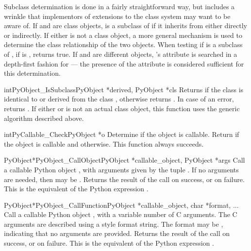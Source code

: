 \documentclass{manual}
\begin{document}
Subclass determination is done in a fairly straightforward way, but
includes a wrinkle that implementors of extensions to the class system
may want to be aware of.  If  and  are class
objects,  is a subclass of  if it inherits from
 either directly or indirectly.  If either is not a class
object, a more general mechanism is used to determine the class
relationship of the two objects.  When testing if  is a
subclass of , if  is ,
 returns true.  If  and
 are different objects, 's  attribute
is searched in a depth-first fashion for  --- the presence of
the  attribute is considered sufficient for this
determination.

\begin{cfuncdesc}{int}{PyObject_IsSubclass}{PyObject *derived,
                                            PyObject *cls}
Returns  if the class  is identical to or derived
from the class , otherwise returns .  In case of an
error, returns .  If either  or  is not
an actual class object, this function uses the generic algorithm
described above.
\end{cfuncdesc}


\begin{cfuncdesc}{int}{PyCallable_Check}{PyObject *o}
Determine if the object  is callable.  Return  if the
object is callable and  otherwise.
This function always succeeds.
\end{cfuncdesc}


\begin{cfuncdesc}{PyObject*}{PyObject_CallObject}{PyObject *callable_object,
                                                  PyObject *args}
Call a callable Python object , with
arguments given by the tuple .  If no arguments are
needed, then  may be \NULL{}.  Returns the result of the
call on success, or \NULL{} on failure.  This is the equivalent
of the Python expression .
\end{cfuncdesc}

\begin{cfuncdesc}{PyObject*}{PyObject_CallFunction}{PyObject *callable_object,
                                                    char *format, ...}
Call a callable Python object , with a
variable number of C arguments. The C arguments are described
using a  style format string. The format may
be \NULL{}, indicating that no arguments are provided.  Returns the
result of the call on success, or \NULL{} on failure.  This is
the equivalent of the Python expression .
\end{cfuncdesc}
\end{document}
